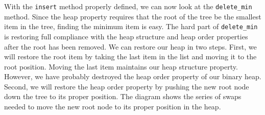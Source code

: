 \documentclass[11pt]{article}
\begin{document}
    With the \texttt{insert} method properly defined, we can now look at the
\texttt{delete\_min} method. Since the heap property requires that the
root of the tree be the smallest item in the tree, finding the minimum
item is easy. The hard part of \texttt{delete\_min} is restoring full
compliance with the heap structure and heap order properties after the
root has been removed. We can restore our heap in two steps. First, we
will restore the root item by taking the last item in the list and
moving it to the root position. Moving the last item maintains our heap
structure property. However, we have probably destroyed the heap order
property of our binary heap. Second, we will restore the heap order
property by pushing the new root node down the tree to its proper
position. The diagram shows the series of swaps needed to move the new
root node to its proper position in the heap.
\end{document}
